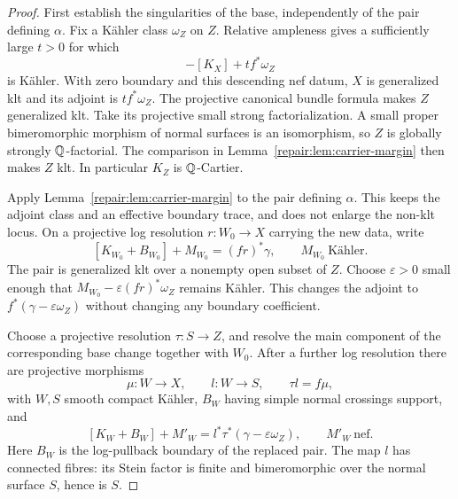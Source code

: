 \begin{proof}
First establish the singularities of the base, independently of the
pair defining $\alpha$. Fix a K\"ahler class $\omega_Z$ on $Z$.
Relative ampleness gives a sufficiently large $t>0$ for which
\[
                  -[K_X]+t f^*\omega_Z
\]
is K\"ahler. With zero boundary and this descending nef datum, $X$
is generalized klt and its adjoint is $t f^*\omega_Z$. The projective
canonical bundle formula \cite[Theorem~2.3]{HP2024} makes $Z$
generalized klt. Take its projective small strong factorialization.
A small proper bimeromorphic morphism of normal surfaces is an
isomorphism, so $Z$ is globally strongly $\mathbb Q$-factorial. The
comparison in Lemma~\ref{repair:lem:carrier-margin} then makes
$Z$ klt. In particular $K_Z$ is $\mathbb Q$-Cartier.

Apply Lemma~\ref{repair:lem:carrier-margin} to the pair defining
$\alpha$. This keeps the adjoint class and an effective boundary
trace, and does not enlarge the non-klt locus. On a projective log
resolution $r:W_0\to X$ carrying the new data, write
\[
 [K_{W_0}+B_{W_0}]+M_{W_0}=(fr)^*\gamma,
                  \qquad M_{W_0}\ \text{K\"ahler}.
\]
The pair is generalized klt over a nonempty open subset of $Z$.
Choose $\varepsilon>0$ small enough that
$M_{W_0}-\varepsilon(fr)^*\omega_Z$ remains K\"ahler. This changes
the adjoint to $f^*(\gamma-\varepsilon\omega_Z)$ without changing
any boundary coefficient.

Choose a projective resolution $\tau:S\to Z$, and resolve the main
component of the corresponding base change together with $W_0$.
After a further log resolution there are projective morphisms
\[
 \mu:W\to X,\qquad l:W\to S,\qquad \tau l=f\mu,
\]
with $W,S$ smooth compact K\"ahler, $B_W$ having simple normal
crossings support, and
\begin{equation}\label{repair:eq:surface-base-adjoint}
 [K_W+B_W]+M'_W
       =l^*\tau^*(\gamma-\varepsilon\omega_Z),
                         \qquad M'_W\ \text{nef}.
\end{equation}
Here $B_W$ is the log-pullback boundary of the replaced pair. The
map $l$ has connected fibres: its Stein factor is finite and
bimeromorphic over the normal surface $S$, hence is $S$.


\end{proof}
